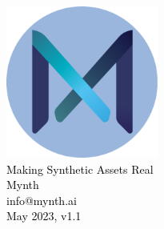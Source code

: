 \documentclass{article}
\begin{document}
\begin{sloppypar}

\begin{titlepage}
\sffamily\selectfont
\centering
\vspace*{7cm}
{\includegraphics[width=5cm]{
mynth-logo.pdf}}\\[5\baselineskip]
\textcolor{black}{
{\Huge Making Synthetic Assets Real}\\[2\baselineskip]
{\Large Mynth}\\[0.5\baselineskip]
{\large info@mynth.ai}\\[3\baselineskip]
{\large May 2023, v1.1}
}
\end{titlepage}

\tableofcontents



\end{sloppypar}
\end{document}
